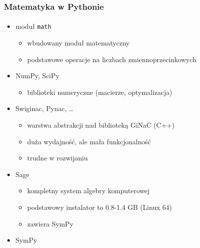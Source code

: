 \documentclass[10pt]{beamer}
\begin{document}
\begin{frame}[fragile]
  \frametitle{Matematyka w Pythonie}
  \framesubtitle{}

  \begin{itemize}
    \item moduł \texttt{math}
      \begin{itemize}
        \item wbudowany moduł matematyczny
        \item podstawowe operacje na liczbach zmiennoprzecinkowych
      \end{itemize}
    \item NumPy, SciPy
      \begin{itemize}
        \item biblioteki numeryczne (macierze, optymalizacja)
      \end{itemize}
    \item Swiginac, Pynac, \ldots
      \begin{itemize}
        \item warstwa abstrakcji nad biblioteką GiNaC (C++)
        \item duża wydajność, ale mała funkcjonalność
        \item trudne w rozwijaniu
      \end{itemize}
    \item Sage
      \begin{itemize}
        \item kompletny system algebry komputerowej
        \item podstawowy instalator to 0.8-1.4 GB (Linux 64)
        \item zawiera SymPy
      \end{itemize}
    \item SymPy
  \end{itemize}
\end{frame}
\end{document}
